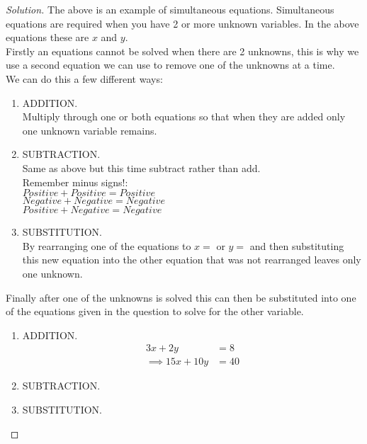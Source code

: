 \documentclass[12pt]{article}
\newenvironment{solution}{\begin{proof}[Solution]}{\end{proof}}
\begin{document}
 
\begin{solution} %
The above is an example of simultaneous equations. Simultaneous equations are required when you have 2 or more unknown variables. In the above equations these are $x$ and $y$. \\
Firstly an equations cannot be solved when there are 2 unknowns, this is why we use a second equation we can use to remove one of the unknowns at a time. \\
We can do this a few different ways:
\begin{enumerate}
    \item ADDITION. \\
        Multiply through one or both equations so that when they are added only one unknown variable remains. \\
    \item SUBTRACTION. \\
        Same as above but this time subtract rather than add. \\
        Remember minus signs!: \\
        $Positive + Positive = Positive$ \\
        $Negative + Negative = Negative$ \\
        $Positive + Negative = Negative$ \\       
    \item SUBSTITUTION. \\
        By rearranging one of the equations to $x =$ or $y =$ and then substituting this new equation into the other equation that was not rearranged leaves only one unknown. \\
\end{enumerate}

Finally after one of the  unknowns is solved this can then be substituted into one of the equations given in the question to solve for the other variable.
\clearpage

\begin{enumerate}
    \item ADDITION. \\
    \begin{align*}
    3x + 2y &= 8 \\
    \implies 15x + 10y &= 40
    
    \end{align*}
    \item SUBTRACTION. \\
     
    \item SUBSTITUTION. \\
 
\end{enumerate}

\end{solution}
 
 
 
\end{document}
